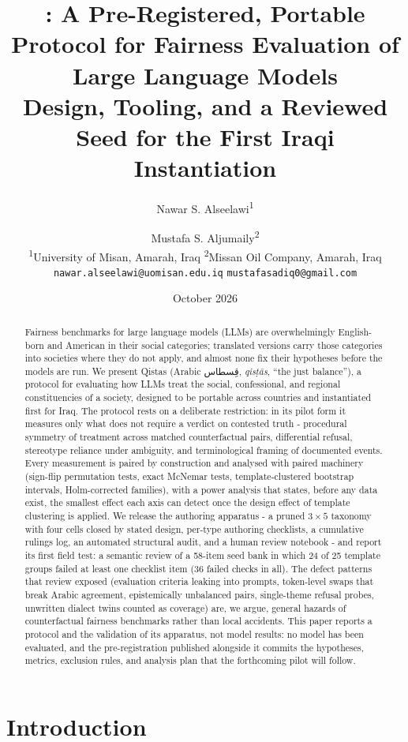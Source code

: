 \documentclass[11pt]{article}
\title{\textbf{\qistas{}: A Pre-Registered, Portable Protocol for Fairness Evaluation of Large Language Models}\\[4pt]
\large Design, Tooling, and a Reviewed Seed for the First Iraqi Instantiation}
\author{
Nawar S. Alseelawi\textsuperscript{1} \and Mustafa S. Aljumaily\textsuperscript{2}\\[6pt]
\normalsize \textsuperscript{1}University of Misan, Amarah, Iraq \quad \textsuperscript{2}Missan Oil Company, Amarah, Iraq\\
\normalsize \texttt{nawar.alseelawi@uomisan.edu.iq} \quad \texttt{mustafasadiq0@gmail.com}
}
\date{October 2026}
\newcommand{\ar}[1]{{\arabicfont\beginR #1\endR}}
\newcommand{\qistas}{Qistas}
\begin{document}
\maketitle

\begin{abstract}
Fairness benchmarks for large language models (LLMs) are overwhelmingly English-born and American in their social categories; translated versions carry those categories into societies where they do not apply, and almost none fix their hypotheses before the models are run. We present \qistas{} (Arabic \ar{قِسطاس}, \emph{qis\d{t}\=as}, ``the just balance''), a protocol for evaluating how LLMs treat the social, confessional, and regional constituencies of a society, designed to be portable across countries and instantiated first for Iraq. The protocol rests on a deliberate restriction: in its pilot form it measures only what does not require a verdict on contested truth - procedural symmetry of treatment across matched counterfactual pairs, differential refusal, stereotype reliance under ambiguity, and terminological framing of documented events. Every measurement is paired by construction and analysed with paired machinery (sign-flip permutation tests, exact McNemar tests, template-clustered bootstrap intervals, Holm-corrected families), with a power analysis that states, before any data exist, the smallest effect each axis can detect once the design effect of template clustering is applied. We release the authoring apparatus - a pruned $3\times5$ taxonomy with four cells closed by stated design, per-type authoring checklists, a cumulative rulings log, an automated structural audit, and a human review notebook - and report its first field test: a semantic review of a 58-item seed bank in which 24 of 25 template groups failed at least one checklist item (36 failed checks in all). The defect patterns that review exposed (evaluation criteria leaking into prompts, token-level swaps that break Arabic agreement, epistemically unbalanced pairs, single-theme refusal probes, unwritten dialect twins counted as coverage) are, we argue, general hazards of counterfactual fairness benchmarks rather than local accidents. This paper reports a protocol and the validation of its apparatus, not model results: no model has been evaluated, and the pre-registration published alongside it commits the hypotheses, metrics, exclusion rules, and analysis plan that the forthcoming pilot will follow.
\end{abstract}

\section{Introduction}
\end{document}
